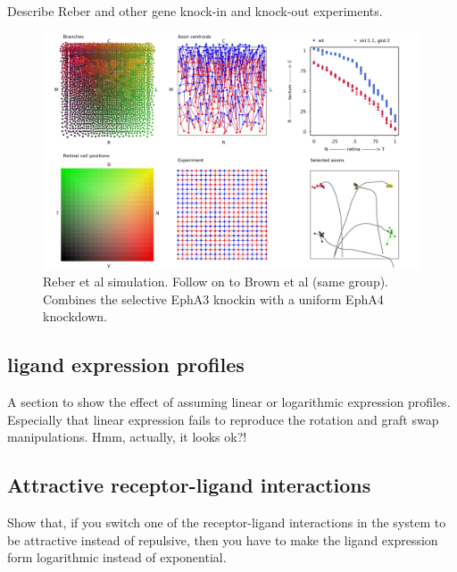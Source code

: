 \documentclass[11pt, a4paper]{article}
\begin{document}
Describe Reber and other gene knock-in and knock-out experiments.

\begin{figure}
\includegraphics[width=\linewidth]{./images/j4_ee_reber.png}
\caption{Reber et al simulation. Follow on to Brown et al (same
group). Combines the selective EphA3 knockin with a uniform EphA4 knockdown.}
\label{f:reber}
\end{figure}

\subsection*{ligand expression profiles}

A section to show the effect of assuming linear or logarithmic expression
profiles. Especially that linear expression fails to reproduce the rotation
and graft swap manipulations. Hmm, actually, it looks ok?!

\subsection*{Attractive receptor-ligand interactions}

Show that, if you switch one of the receptor-ligand  interactions in the
system to be attractive instead of repulsive, then you have to make the ligand
expression form logarithmic instead of exponential.
\end{document}
